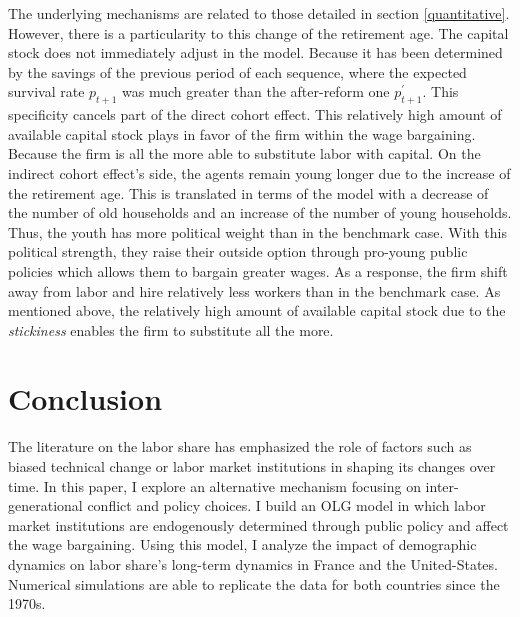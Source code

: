 \documentclass[
]{article}
\begin{document}
The underlying mechanisms are related to those detailed in section \ref{quantitative}. However, there is a particularity to this change of the retirement age. The capital stock does not immediately adjust in the model. Because it has been determined by the savings of the previous period of each sequence, where the expected survival rate \(p_{t+1}\) was much greater than the after-reform one \(p^\prime_{t+1}\). This specificity cancels part of the direct cohort effect. This relatively high amount of available capital stock plays in favor of the firm within the wage bargaining. Because the firm is all the more able to substitute labor with capital. On the indirect cohort effect's side, the agents remain young longer due to the increase of the retirement age. This is translated in terms of the model with a decrease of the number of old households and an increase of the number of young households. Thus, the youth has more political weight than in the benchmark case. With this political strength, they raise their outside option through pro-young public policies which allows them to bargain greater wages. As a response, the firm shift away from labor and hire relatively less workers than in the benchmark case. As mentioned above, the relatively high amount of available capital stock due to the \emph{stickiness} enables the firm to substitute all the more.

\hypertarget{conclusion}{%
\section{Conclusion}\label{conclusion}}

The literature on the labor share has emphasized the role of factors such as biased technical change or labor market institutions in shaping its changes over time.
In this paper, I explore an alternative mechanism focusing on inter-generational conflict and policy choices.
I build an OLG model in which labor market institutions are endogenously determined through public policy and affect the wage bargaining.
Using this model, I analyze the impact of demographic dynamics on labor share's long-term dynamics in France and the United-States.
Numerical simulations are able to replicate the data for both countries since the 1970s.
\end{document}
